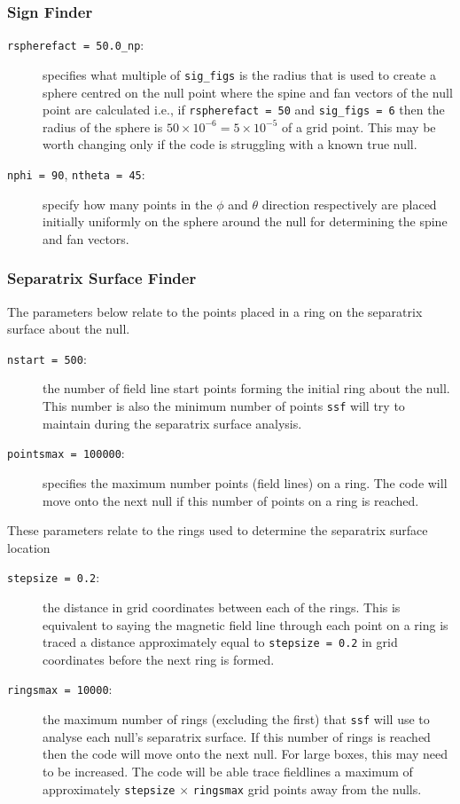 \documentclass[12pt]{article}
\begin{document}
      \subsubsection{Sign Finder}
        \begin{description}
          \item [\texttt{rspherefact = 50.0\_np}:] specifies what multiple of \texttt{sig\_figs} is the radius that is used to create a sphere centred on the null point where the spine and fan vectors of the null point are calculated i.e., if \texttt{rspherefact = 50} and \texttt{sig\_figs = 6} then the radius of the sphere is  \( 50 \times 10^{-6} = 5\times 10^{-5} \) of a grid point. This may be worth changing only if the code is struggling with a known true null.
          \item [\texttt{nphi = 90}, \texttt{ntheta = 45}:] specify how many points in the \( \phi \) and \( \theta \) direction respectively are placed initially uniformly on the sphere around the null for determining the spine and fan vectors.
        \end{description}

      \subsubsection{Separatrix Surface Finder}
        The parameters below relate to the points placed in a ring on the separatrix surface about the null.
        \begin{description}
          \item [\texttt{nstart = 500}:] the number of field line start points forming the initial ring about the null. This number is also the minimum number of points \texttt{ssf} will try to maintain during the separatrix surface analysis.
          \item [\texttt{pointsmax = 100000}:] specifies the maximum number points (field lines) on a ring. The code will move onto the next null if this number of points on a ring is reached.
        \end{description}

        These parameters relate to the rings used to determine the separatrix surface location

        \begin{description}
          \item [\texttt{stepsize = 0.2}:] the distance in grid coordinates between each of the rings. This is equivalent to saying the magnetic field line through each point on a ring is traced a distance approximately equal to \texttt{stepsize = 0.2} in grid coordinates before the next ring is formed.
          \item [\texttt{ringsmax = 10000}:] the maximum number of rings (excluding the first) that \texttt{ssf} will use to analyse each null's separatrix surface. If this number of rings is reached then the code will move onto the next null. For large boxes, this may need to be increased. The code will be able trace fieldlines a maximum of approximately \texttt{stepsize} \( \times \) \texttt{ringsmax} grid points away from the nulls.
        \end{description}
\end{document}
